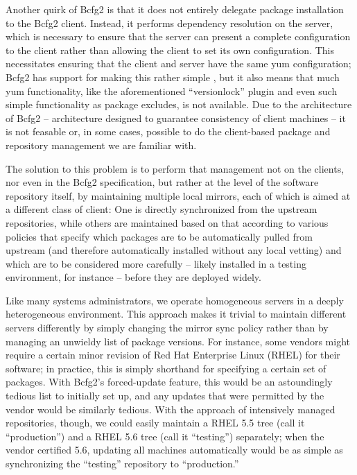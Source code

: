 Another quirk of Bcfg2 is that it does not entirely delegate package
installation to the Bcfg2 client.  Instead, it performs dependency
resolution on the server, which is necessary to ensure that the server
can present a complete configuration to the client rather than
allowing the client to set its own configuration.  This necessitates
ensuring that the client and server have the same yum configuration;
Bcfg2 has support for making this rather simple \cite{JL11}, but it
also means that much yum functionality, like the aforementioned
``versionlock'' plugin and even such simple functionality as package
excludes, is not available.  Due to the architecture of Bcfg2 --
architecture designed to guarantee consistency of client machines --
it is not feasable or, in some cases, possible to do the client-based
package and repository management we are familiar with.

The solution to this problem is to perform that management not on the
clients, nor even in the Bcfg2 specification, but rather at the level
of the software repository itself, by maintaining multiple local
mirrors, each of which is aimed at a different class of client: One is
directly synchronized from the upstream repositories, while others are
maintained based on that according to various policies that specify
which packages are to be automatically pulled from upstream (and
therefore automatically installed without any local vetting) and which
are to be considered more carefully -- likely installed in a testing
environment, for instance -- before they are deployed widely.

Like many systems administrators, we operate homogeneous servers in a
deeply heterogeneous environment.  This approach makes it trivial to
maintain different servers differently by simply changing the mirror
sync policy rather than by managing an unwieldy list of package
versions.  For instance, some vendors might require a certain minor
revision of Red Hat Enterprise Linux (RHEL) for their software; in
practice, this is simply shorthand for specifying a certain set of
packages.  With Bcfg2's forced-update feature, this would be an
astoundingly tedious list to initially set up, and any updates that
were permitted by the vendor would be similarly tedious.  With the
approach of intensively managed repositories, though, we could easily
maintain a RHEL 5.5 tree (call it ``production'') and a RHEL 5.6 tree
(call it ``testing'') separately; when the vendor certified 5.6,
updating all machines automatically would be as simple as
synchronizing the ``testing'' repository to ``production.''

